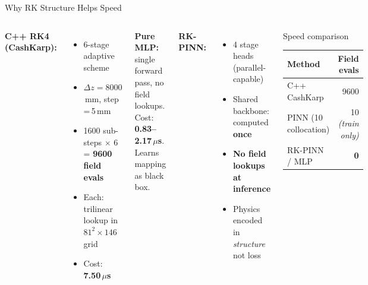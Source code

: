 \documentclass[aspectratio=169, 11pt]{beamer}
\begin{document}
\begin{frame}{Why RK Structure Helps Speed}
  \begin{columns}[T]
    \textbf{C++ RK4 (CashKarp):}
    \begin{itemize}\setlength{\itemsep}{1pt}
      \item 6-stage adaptive scheme
      \item $\Delta z = 8000$\,mm, step\,=\,5\,mm
      \item 1600 sub-steps $\times$ 6 = \textbf{9600 field evals}
      \item Each: trilinear lookup in $81^2 \times 146$ grid
      \item Cost: \textbf{7.50\,$\mu$s}
    \end{itemize}

    \medskip
    \textbf{Pure MLP:} single forward pass, no field lookups.\\
    Cost: \textbf{0.83--2.17\,$\mu$s}. Learns mapping as black box.

    \textbf{RK-PINN:}
    \begin{itemize}\setlength{\itemsep}{1pt}
      \item 4 stage heads (parallel-capable)
      \item Shared backbone: computed \textbf{once}
      \item \textbf{No field lookups at inference}
      \item Physics encoded in \emph{structure} not loss
    \end{itemize}

    \begin{block}{Speed comparison}
      \centering\small
      \begin{tabular}{lr}
        \toprule
        \textbf{Method} & \textbf{Field evals} \\
        \midrule
        C++ CashKarp & 9600 \\
        PINN (10 collocation) & 10 \textit{(train only)} \\
        RK-PINN / MLP & \textbf{0} \\
        \bottomrule
      \end{tabular}
    \end{block}
  \end{columns}
\end{frame}

\end{document}
